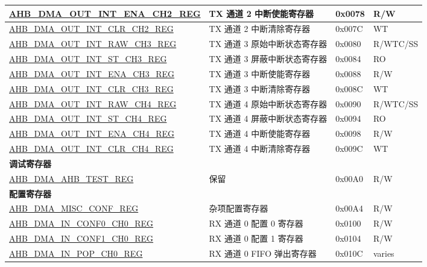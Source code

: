 \begin{longtable}{ | l | l | p{1.3cm} | l | }
\hyperref[regdesc:AHBDMAOUTINTENACHNREG]{AHB\_DMA\_OUT\_INT\_ENA\_CH2\_REG} & TX 通道 2 中断使能寄存器 & 0x0078 & R/W    \\ \hline
\hyperref[regdesc:AHBDMAOUTINTCLRCHNREG]{AHB\_DMA\_OUT\_INT\_CLR\_CH2\_REG} & TX 通道 2 中断清除寄存器 & 0x007C & WT    \\ \hline
\hyperref[regdesc:AHBDMAOUTINTRAWCHNREG]{AHB\_DMA\_OUT\_INT\_RAW\_CH3\_REG} & TX 通道 3 原始中断状态寄存器 & 0x0080 & R/WTC/SS    \\ \hline
\hyperref[regdesc:AHBDMAOUTINTSTCHNREG]{AHB\_DMA\_OUT\_INT\_ST\_CH3\_REG} & TX 通道 3 屏蔽中断状态寄存器 & 0x0084 & RO    \\ \hline
\hyperref[regdesc:AHBDMAOUTINTENACHNREG]{AHB\_DMA\_OUT\_INT\_ENA\_CH3\_REG} & TX 通道 3 中断使能寄存器 & 0x0088 & R/W    \\ \hline
\hyperref[regdesc:AHBDMAOUTINTCLRCHNREG]{AHB\_DMA\_OUT\_INT\_CLR\_CH3\_REG} & TX 通道 3 中断清除寄存器 & 0x008C & WT    \\ \hline
\hyperref[regdesc:AHBDMAOUTINTRAWCHNREG]{AHB\_DMA\_OUT\_INT\_RAW\_CH4\_REG} & TX 通道 4 原始中断状态寄存器 & 0x0090 & R/WTC/SS    \\ \hline
\hyperref[regdesc:AHBDMAOUTINTSTCHNREG]{AHB\_DMA\_OUT\_INT\_ST\_CH4\_REG} & TX 通道 4 屏蔽中断状态寄存器 & 0x0094 & RO    \\ \hline
\hyperref[regdesc:AHBDMAOUTINTENACHNREG]{AHB\_DMA\_OUT\_INT\_ENA\_CH4\_REG} & TX 通道 4 中断使能寄存器 & 0x0098 & R/W    \\ \hline
\hyperref[regdesc:AHBDMAOUTINTCLRCHNREG]{AHB\_DMA\_OUT\_INT\_CLR\_CH4\_REG} & TX 通道 4 中断清除寄存器 & 0x009C & WT    \\ \hline
\multicolumn{4}{|l|}{\textbf{调试寄存器}} \\ \hline
\hyperref[regdesc:AHBDMAAHBTESTREG]{AHB\_DMA\_AHB\_TEST\_REG} & 保留 & 0x00A0 & R/W    \\ \hline
\multicolumn{4}{|l|}{\textbf{配置寄存器}} \\ \hline
\hyperref[regdesc:AHBDMAMISCCONFREG]{AHB\_DMA\_MISC\_CONF\_REG} & 杂项配置寄存器 & 0x00A4 & R/W    \\ \hline
\hyperref[regdesc:AHBDMAINCONF0CHNREG]{AHB\_DMA\_IN\_CONF0\_CH0\_REG} & RX 通道 0 配置 0 寄存器 & 0x0100 & R/W    \\ \hline
\hyperref[regdesc:AHBDMAINCONF1CHNREG]{AHB\_DMA\_IN\_CONF1\_CH0\_REG} & RX 通道 0 配置 1 寄存器 & 0x0104 & R/W    \\ \hline
\hyperref[regdesc:AHBDMAINPOPCHNREG]{AHB\_DMA\_IN\_POP\_CH0\_REG} & RX 通道 0 FIFO 弹出寄存器 & 0x010C & varies    \\ \hline

\end{longtable}
